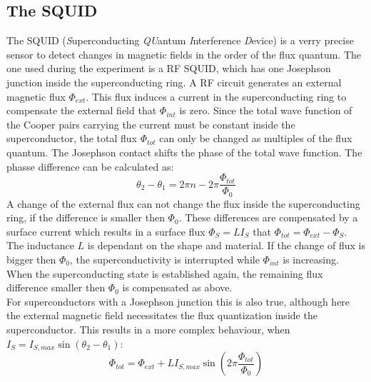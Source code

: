 \subsection{The SQUID}
The SQUID (\emph{S}uperconducting \emph{QU}antum \emph{I}nterference \emph{D}evice) is a verry precise sensor to detect changes in magnetic fields in the order of the flux quantum. The one used during the experiment is a RF SQUID, which has one Josephson junction inside the superconducting ring. A RF circuit generates an external magnetic flux $\Phi_{ext}$. This flux induces a current in the superconducting ring to compensate the external field that $\Phi_{int}$ is zero. 
Since the total wave function of the Cooper pairs carrying the current must be constant inside the superconductor, the total flux $\Phi_{tot}$ can only be changed as multiples of the flux quantum. The Josephson contact shifts the phase of the total wave function. The phasse difference can be calculated as: $$ \theta_2 - \theta_1 = 2 \pi n -2\pi \frac{\Phi_{tot}}{\Phi_0}$$
A change of the external flux can not change the flux inside the superconducting ring, if the difference is smaller then $\Phi_0$. These differences are compensated by a surface current which results in a surface flux $\Phi_S = L I_S$ that $\Phi_{tot} = \Phi_{ext}-\Phi_S$. The inductance $L$ is dependant on the shape and material. 
If the change of flux is bigger then $\Phi_0$, the superconductivity is interrupted while $\Phi_{int}$ is increasing. When the superconducting state is established again, the remaining flux difference smaller then $\Phi_0$ is compensated as above.\\

For superconductors with a Josephson junction this is also true, although here the external magnetic field necessitates the flux quantization inside the superconductor. This results in a more complex behaviour, when $I_S = I_{S,max} \sin\left( \theta_2-\theta_1\right) $:
$$ \Phi_{tot}=\Phi_{ext} + L I_{S,max}\sin\left( 2\pi \frac{\Phi_{tot}}{\Phi_0}\right)$$

